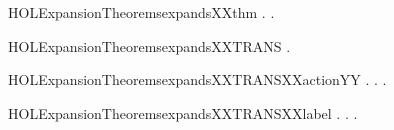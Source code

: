 \begin{SaveVerbatim}{HOLExpansionTheoremsexpandsXXthm}
\HOLTokenTurnstile{} \HOLSymConst{\HOLTokenForall{}} .    \HOLSymConst{\HOLTokenEquiv{}} \HOLSymConst{\HOLTokenExists{}}.    \HOLSymConst{\HOLTokenConj{}}  
\end{SaveVerbatim}
\newcommand{\HOLExpansionTheoremsexpandsXXthm}{\UseVerbatim{HOLExpansionTheoremsexpandsXXthm}}
\begin{SaveVerbatim}{HOLExpansionTheoremsexpandsXXTRANS}
\HOLTokenTurnstile{} \HOLSymConst{\HOLTokenForall{}}  .    \HOLSymConst{\HOLTokenConj{}}    \HOLSymConst{\HOLTokenImp{}}   
\end{SaveVerbatim}
\newcommand{\HOLExpansionTheoremsexpandsXXTRANS}{\UseVerbatim{HOLExpansionTheoremsexpandsXXTRANS}}
\begin{SaveVerbatim}{HOLExpansionTheoremsexpandsXXTRANSXXactionYY}
\HOLTokenTurnstile{} \HOLSymConst{\HOLTokenForall{}} .
          \HOLSymConst{\HOLTokenImp{}}
       \HOLSymConst{\HOLTokenForall{}} .  \HOLTokenTransBegin{}\HOLTokenTransEnd {} \HOLSymConst{\HOLTokenImp{}} \HOLSymConst{\HOLTokenExists{}}.  \HOLTokenWeakTransBegin{}\HOLTokenWeakTransEnd {} \HOLSymConst{\HOLTokenConj{}}   
\end{SaveVerbatim}
\newcommand{\HOLExpansionTheoremsexpandsXXTRANSXXactionYY}{\UseVerbatim{HOLExpansionTheoremsexpandsXXTRANSXXactionYY}}
\begin{SaveVerbatim}{HOLExpansionTheoremsexpandsXXTRANSXXlabel}
\HOLTokenTurnstile{} \HOLSymConst{\HOLTokenForall{}} .
          \HOLSymConst{\HOLTokenImp{}}
       \HOLSymConst{\HOLTokenForall{}} .
            \HOLTokenTransBegin{} \HOLTokenTransEnd {} \HOLSymConst{\HOLTokenImp{}} \HOLSymConst{\HOLTokenExists{}}.  \HOLTokenTransBegin{} \HOLTokenTransEnd {} \HOLSymConst{\HOLTokenConj{}}   
\end{SaveVerbatim}
